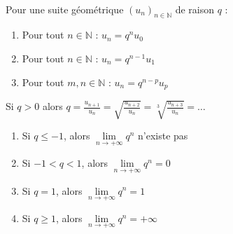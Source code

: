 \documentclass[main.tex]{subfiles}
\begin{document}
\begin{proposition}\hfill\\
	 Pour une suite géométrique  $(u_n)_{n\in\mathbb{N}}$ de raison $q$ :
\begin{enumerate}[label=\textbullet,leftmargin=*]
	\item Pour tout $n\in\mathbb{N}$ : $u_{n}=q^n u_0$
	\item Pour tout $n\in\mathbb{N}$ : $u_{n}=q^{n-1} u_1$
	\item Pour tout $m,n\in\mathbb{N}$ : $u_{n}=q^{n-p} u_p$
\end{enumerate}
	\end{proposition}
\begin{remark} 
	Si $q>0$ alors $q= {\frac{u_{n+1}}{u_{n}}}= \sqrt{\frac{u_{n+2}}{u_{n}}}= \sqrt[3]{\frac{u_{n+3}}{u_{n}}}=\ldots$
	\end{remark}
\begin{proposition}\hfill 
	\begin{enumerate}[label=\textbullet,leftmargin=*]
		\item Si $q\leqslant -1$, alors $\lim\limits_{n\to+\infty}q^n$ n'existe pas \smallskip
		\item Si $-1<q<1$, alors $\lim\limits_{n\to+\infty}q^n =0$ \smallskip
		\item Si $q=1$, alors $\lim\limits_{n\to+\infty}q^n =1$ \smallskip
		\item Si $q\geqslant 1$, alors $\lim\limits_{n\to+\infty}q^n =+\infty$
	\end{enumerate} 
\end{proposition} 
%	 
\newpage 
{}  
\pagestyle{scrheadings} %
\onehalfspacing  
\end{document}
